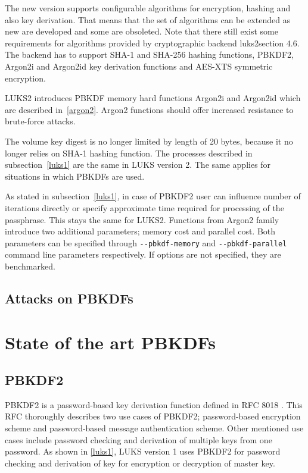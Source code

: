 \documentclass[nolof]{fithesis3}
\begin{document}
The new version supports configurable algorithms for encryption, hashing and also key derivation. That means that the set of algorithms can be extended as new are developed and some are obsoleted. Note that there still exist some requirements for algorithms provided by cryptographic backend \parencite{}{luks2}{section 4.6}. The backend has to support SHA-1 and SHA-256 hashing functions, PBKDF2, Argon2i and Argon2id key derivation functions and AES-XTS symmetric encryption.

LUKS2 introduces PBKDF memory hard functions Argon2i and Argon2id which are described in~\ref{argon2}. Argon2 functions should offer increased resistance to brute-force attacks.

The volume key digest is no longer limited by length of 20 bytes, because it no longer relies on SHA-1 hashing function. The processes described in subsection~\ref{luks1} are the same in LUKS version 2. The same applies for situations in which PBKDFs are used. 

As stated in subsection~\ref{luks1},  in case of PBKDF2 user can influence number of iterations directly or specify approximate time required for processing of the passphrase. This stays the same for LUKS2. Functions from Argon2 family introduce two additional parameters; memory cost and parallel cost. Both parameters can be specified through \verb+--pbkdf-memory+ and \verb+--pbkdf-parallel+ command line parameters respectively. If options are not specified, they are benchmarked.

\section{Attacks on PBKDFs}
\label{sec:attacks}



\chapter{State of the art PBKDFs}
\label{chap:pbkdfs}


\section{PBKDF2}
\label{sec:pbkdf2}

PBKDF2 is a password-based key derivation function defined in RFC 8018 \parencite{rfc8018}. This RFC thoroughly describes two use cases of PBKDF2; password-based encryption scheme and password-based message authentication scheme. Other mentioned use cases include password checking and derivation of multiple keys from one password. As shown in \ref{luks1}, LUKS version 1 uses PBKDF2 for password checking and derivation of key for encryption or decryption of master key.
\end{document}
